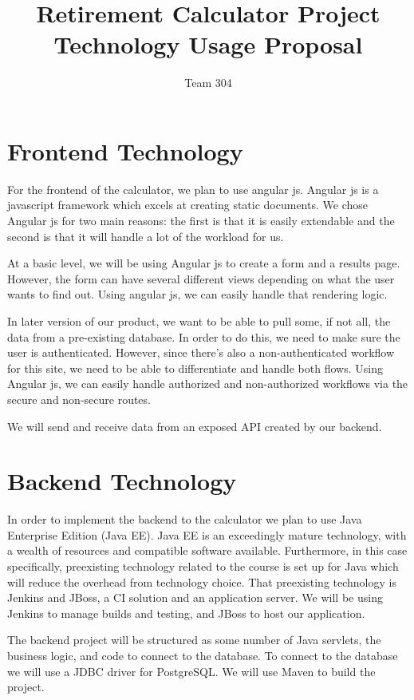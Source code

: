 \documentclass{article}
\title{Retirement Calculator Project Technology Usage Proposal}
\author{Team 304}
\begin{document}
\maketitle

\section*{Frontend Technology}

For the frontend of the calculator, we plan to use angular js. 
Angular js is a javascript framework which excels at creating
static documents. We chose Angular js for two main reasons:
the first is that it is easily extendable and the second is 
that it will handle a lot of the workload for us.

At a basic level, we will be using Angular js to create a
form and a results page. However, the form can have several
different views depending on what the user wants to find out.
Using angular js, we can easily handle that rendering logic.

In later version of our product, we want to be able to pull
some, if not all, the data from a pre-existing database. In
order to do this, we need to make sure the user is 
authenticated. However, since there's also a non-authenticated
workflow for this site, we need to be able to differentiate
and handle both flows. Using Angular js, we can easily handle
authorized and non-authorized workflows via the secure and
non-secure routes.

We will send and receive data from an exposed API created 
by our backend.

\section*{Backend Technology}

In order to implement the backend to the calculator
we plan to use Java Enterprise Edition (Java EE).
Java EE is an exceedingly mature technology,
with a wealth of resources and compatible software available.
Furthermore,
in this case specifically,
preexisting technology related to the course is set up for Java
which will reduce the overhead from technology choice.
That preexisting technology is Jenkins and JBoss,
a CI solution and an application server.
We will be using Jenkins to manage builds and testing,
and JBoss to host our application.

The backend project will be structured as some number of Java servlets,
the business logic,
and code to connect to the database.
To connect to the database we will use a JDBC driver for PostgreSQL.
We will use Maven to build the project.
\end{document}

